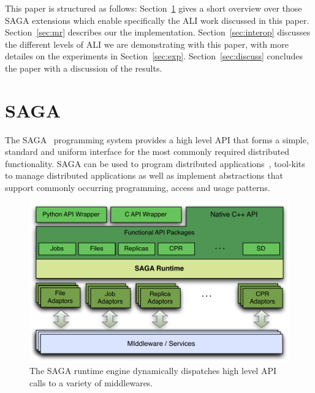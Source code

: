 \documentclass[3p,twocolumn]{elsarticle}
\begin{document}

This paper is structured as follows: Section~\ref{sec:saga} gives
a short overview over those SAGA extensions which enable specifically
the ALI work discussed in this paper.  Section~\ref{sec:mr} describes
our the \smr implementation.  Section~\ref{sec:interop} discusses the
different levels of ALI we are demonstrating with this paper, with more
detailes on the experiments in Section~\ref{sec:exp}.
Section~\ref{sec:discuss} concludes the paper with a discussion of the
results.








\section{SAGA}
\label{sec:saga}

The SAGA~\cite{saga-core, Kaiser:2006qp} programming system provides
a high level API that forms a simple, standard and uniform interface for
the most commonly required distributed functionality.  SAGA can be used
to program distributed applications~\cite{saga_escience07, saga_tg08},
tool-kits to manage distributed applications as well as implement
abstractions that support commonly occurring programming, access and
usage patterns.

\begin{figure}[t]
 \includegraphics[scale=0.5]{saga-figure02.pdf}
 \caption{The SAGA runtime engine dynamically dispatches high level
          API calls to a variety of middlewares.}
 \label{fig:saga}
\end{figure}
\end{document}
